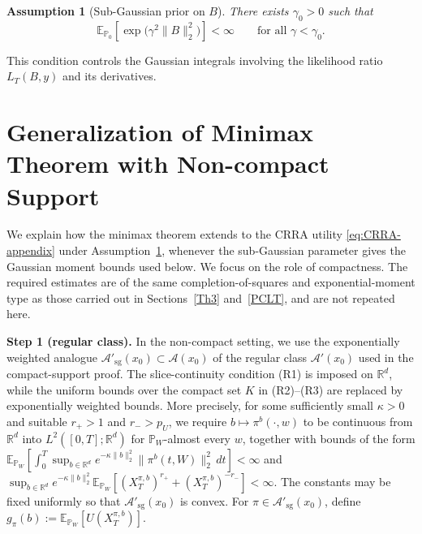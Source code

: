 \documentclass[11pt]{article}
\newtheorem{assumption}{Assumption}
\theoremstyle{definition}
\newcommand{\E}{\mathbb{E}}
\begin{document}
\begin{assumption}[Sub-Gaussian prior on $B$]
\label{ass:subgaussian-B}
There exists $\gamma_0>0$ such that
\[
  \E_{\mathbb{P}_0}\!\left[\exp\bigl(\gamma^2 \|B\|_2^2\bigr)\right]
  < \infty
  \qquad \text{for all } \gamma < \gamma_0 .
\]
\end{assumption}

{This condition controls the Gaussian integrals involving the likelihood
ratio $L_T(B,y)$ and its derivatives.}

\section{Generalization of Minimax Theorem with Non-compact Support}
\label{Th2}

{
We explain how the minimax theorem extends to the CRRA utility
\eqref{eq:CRRA-appendix} under Assumption~\ref{ass:subgaussian-B},
whenever the sub-Gaussian parameter gives the Gaussian moment bounds used below. We focus on the role of
compactness. The required estimates are of the same
completion-of-squares and exponential-moment type as those carried out
in Sections~\ref{Th3} and~\ref{PCLT}, and are not repeated here.
}

\medskip\noindent
{
\textbf{Step 1 (regular class).}
In the non-compact setting, we use the exponentially weighted analogue
$\mathcal A'_{\mathrm{sg}}(x_0)\subset\mathcal A(x_0)$ of the regular
class $\mathcal A'(x_0)$ used in the compact-support proof. The
slice-continuity condition (R1) is imposed on $\mathbb R^d$, while the
uniform bounds over the compact set $K$ in (R2)--(R3) are replaced by
exponentially weighted bounds. More precisely, for some sufficiently
small $\kappa>0$ and suitable $r_+>1$ and $r_->p_U$, we require
$b\mapsto\pi^b(\cdot,w)$ to be continuous from $\mathbb R^d$ into
$L^2([0,T];\mathbb R^d)$ for $\mathbb P_W$-almost every $w$, together
with bounds of the form $\mathbb E_{\mathbb P_W}\!\left[
\int_0^T
\sup_{b\in\mathbb R^d}
e^{-\kappa\|b\|_2^2}
\|\pi^b(t,W)\|_2^2\,dt
\right]<\infty$ and $\sup_{b\in\mathbb R^d}
e^{-\kappa\|b\|_2^2}
\mathbb E_{\mathbb P_W}\!\left[
(X_T^{\pi,b})^{r_+}+(X_T^{\pi,b})^{-r_-}
\right]<\infty.$
The constants may be fixed uniformly so that
$\mathcal A'_{\mathrm{sg}}(x_0)$ is convex. For
$\pi\in\mathcal A'_{\mathrm{sg}}(x_0)$, define $g_\pi(b)
:=
\mathbb E_{\mathbb P_W}
\!\left[U(X_T^{\pi,b})\right].$
}
\end{document}
